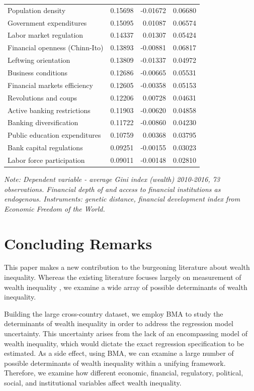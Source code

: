 \begin{refsection}
\begin{table}[!ht]
\begin{threeparttable}
\begin{tabular}{lrrr}
		Population density & 0.15698 & -0.01672 & 0.06680 \\ 
		Government expenditures & 0.15095 & 0.01087 & 0.06574 \\ 
		Labor market regulation & 0.14337 & 0.01307 & 0.05424 \\ 
		Financial openness (Chinn-Ito) & 0.13893 & -0.00881 & 0.06817 \\ 
		Leftwing orientation & 0.13809 & -0.01337 & 0.04972 \\ 
		Business conditions & 0.12686 & -0.00665 & 0.05531 \\ 
		Financial markets efficiency & 0.12605 & -0.00358 & 0.05153 \\ 
		Revolutions and coups & 0.12206 & 0.00728 & 0.04631 \\ 
		Active banking restrictions & 0.11903 & -0.00620 & 0.04858 \\ 
		Banking diversification & 0.11722 & -0.00860 & 0.04230 \\ 
		Public education expenditures & 0.10759 & 0.00368 & 0.03795 \\ 
		Bank capital regulations & 0.09251 & -0.00155 & 0.03023 \\ 
		Labor force participation & 0.09011 & -0.00148 & 0.02810 \\ 
		\bottomrule
	\end{tabular}
\begin{tablenotes}
\footnotesize
\item \textit{Note: Dependent variable - average Gini index (wealth) 2010-2016, 73 observations. Financial depth of and access to financial institutions as endogenous. Instruments: genetic distance, financial development index from Economic Freedom of the World.}
\end{tablenotes}
\end{threeparttable}
\end{table}
%
%
%
%
%
\section{Concluding Remarks}
\label{ch3sec:conclusion}

This paper makes a new contribution to the burgeoning literature about wealth inequality. Whereas the existing literature focuses largely on measurement of wealth inequality \parencite{alvaredoetal2013,daviesetal2011,pikettyandzucman2014,SaezZucman2016}, we examine a wide array of possible determinants of wealth inequality. 

Building the large cross-country dataset, we employ \ac{BMA} to study the determinants of wealth inequality in order to address the regression model uncertainty. This uncertainty arises from the lack of an encompassing model of wealth inequality, which would dictate the exact regression specification to be estimated. As a side effect, using \ac{BMA}, we can examine a large number of possible determinants of wealth inequality within a unifying framework. Therefore, we examine how different economic, financial, regulatory, political, social, and institutional variables affect wealth inequality.  


\end{refsection}
